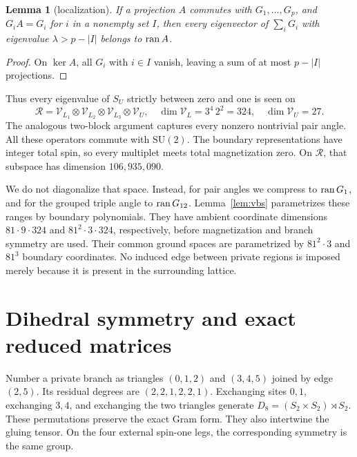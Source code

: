 \documentclass[11pt,a4paper]{article}
\newtheorem{lemma}[theorem]{Lemma}\newtheorem{proposition}[theorem]{Proposition}
\theoremstyle{remark}\newtheorem{remark}[theorem]{Remark}
\begin{document}
\begin{lemma}[localization]\label{lem:local}
If a projection $A$ commutes with $G_1,\ldots,G_p$, and $G_iA=G_i$ for $i$ in a nonempty set $I$, then every eigenvector of $\sum_iG_i$ with eigenvalue $\lambda>p-|I|$ belongs to $\operatorname{ran} A$.
\end{lemma}
\begin{proof}
On $\ker A$, all $G_i$ with $i\in I$ vanish, leaving a sum of at most $p-|I|$ projections.
\end{proof}
Thus every eigenvalue of $S_U$ strictly between zero and one is seen on
\begin{equation}\label{eq:localized}
 \mathcal R=\mathcal V_{L_1}\otimes\mathcal V_{L_2}\otimes\mathcal V_{L_3}\otimes\mathcal V_U,
 \quad \dim\mathcal V_L=3^4\,2^2=324,\quad\dim\mathcal V_U=27.
\end{equation}
The analogous two-block argument captures every nonzero nontrivial pair angle. All these operators commute with $\mathrm{SU}(2)$. The boundary representations have integer total spin, so every multiplet meets total magnetization zero. On $\mathcal R$, that subspace has dimension $106,935,090$.

We do not diagonalize that space. Instead, for pair angles we compress to $\operatorname{ran} G_1$, and for the grouped triple angle to $\operatorname{ran} G_{12}$. Lemma~\ref{lem:vbs} parametrizes these ranges by boundary polynomials. They have ambient coordinate dimensions $81\cdot9\cdot324$ and $81^2\cdot3\cdot324$, respectively, before magnetization and branch symmetry are used. Their common ground spaces are parametrized by $81^2\cdot3$ and $81^3$ boundary coordinates. No induced edge between private regions is imposed merely because it is present in the surrounding lattice.

\section{Dihedral symmetry and exact reduced matrices}\label{sec:reduced}
Number a private branch as triangles $(0,1,2)$ and $(3,4,5)$ joined by edge $(2,5)$. Its residual degrees are $(2,2,1,2,2,1)$. Exchanging sites $0,1$, exchanging $3,4$, and exchanging the two triangles generate $D_8=(S_2\times S_2)\rtimes S_2$. These permutations preserve the exact Gram form. They also intertwine the gluing tensor. On the four external spin-one legs, the corresponding symmetry is the same group.
\end{document}
